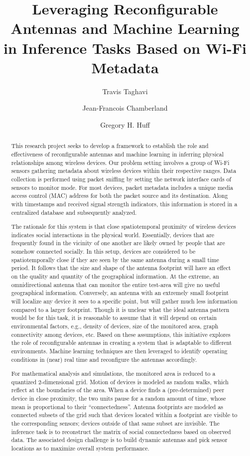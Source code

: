 \documentclass{ursiNRSM}
\title{Leveraging Reconfigurable Antennas and Machine Learning\\
in Inference Tasks Based on Wi-Fi Metadata}
\author[org1]{Travis Taghavi}
\author[org1]{Jean-Francois Chamberland}
\author[org1]{Gregory H. Huff}
\begin{document}
\begin{abstract}

This research project seeks to develop a framework to establish the role and effectiveness of reconfigurable antennas and machine learning in inferring physical relationships among wireless devices.
Our problem setting involves a group of Wi-Fi sensors gathering metadata about wireless devices within their respective ranges.
Data collection is performed using packet sniffing by setting the network interface cards of sensors to monitor mode.
For most devices, packet metadata includes a unique media access control (MAC) address for both the packet source and its destination.
Along with timestamps and received signal strength indicators, this information is stored in a centralized database and subsequently analyzed.

The rationale for this system is that close spatiotemporal proximity of wireless devices indicates social interactions in the physical world.
Essentially, devices that are frequently found in the vicinity of one another are likely owned by people that are somehow connected socially.
In this setup, devices are considered to be spatiotemporally close if they are seen by the same antenna during a small time period.
It follows that the size and shape of the antenna footprint will have an effect on the quality and quantity of the geographical information.
At the extreme, an omnidirectional antenna that can monitor the entire test-area will give no useful geographical information.
Conversely, an antenna with an extremely small footprint will localize any device it sees to a specific point, but will gather much less information compared to a larger footprint.
Though it is unclear what the ideal antenna pattern would be for this task, it is reasonable to assume that it will depend on certain environmental factors, e.g., density of devices, size of the monitored area, graph connectivity among devices, etc.
Based on these assumptions, this initiative explores the role of reconfigurable antennas in creating a system that is adaptable to different environments.
Machine learning techniques are then leveraged to identify operating conditions in (near) real time and reconfigure the antennas accordingly.

For mathematical analysis and simulations, the monitored area is reduced to a quantized 2-dimensional grid.
Motion of devices is modeled as random walks, which reflect at the boundaries of the area.
When a device finds a (pre-determined) peer device in close proximity, the two units pause for a random amount of time, whose mean is proportional to their ``connectedness''.
Antenna footprints are modeled as connected subsets of the grid such that devices located within a footprint are visible to the corresponding sensors; devices outside of that same subset are invisible.
The inference task is to reconstruct the matrix of social connectedness based on observed data.
The associated design challenge is to build dynamic antennas and pick sensor locations as to maximize overall system performance.

\end{abstract}
\end{document}
